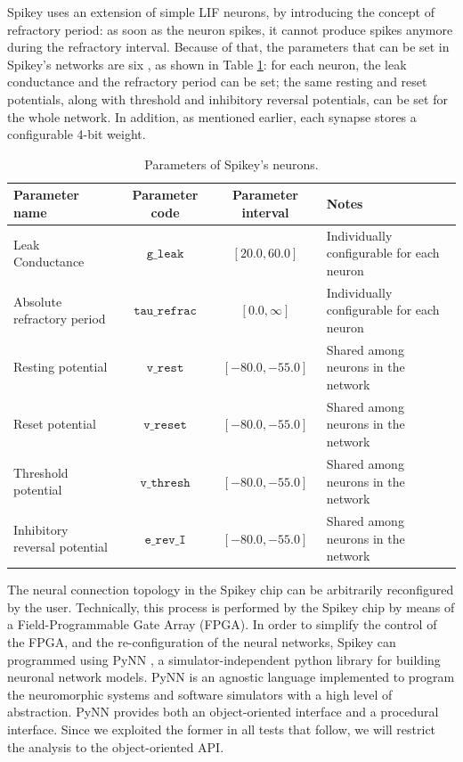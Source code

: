 \documentclass[utf8]{frontiersFPHY} %
\begin{document}
Spikey uses an extension of simple LIF neurons, by introducing the concept  of refractory period: as soon as the neuron spikes, it cannot produce  spikes anymore during the refractory interval. 
Because of that, the parameters that can be set in Spikey's networks are six \cite{Pfeil2013}, as shown in Table \ref{tab:parameters}: for each neuron, the leak conductance and the refractory period can be set; the same resting and reset potentials, along with threshold and inhibitory reversal potentials, can be set for the whole network. In addition, as mentioned earlier, each synapse stores a configurable 4-bit weight.


\begin{table}[tb]
	\caption{Parameters of Spikey's neurons.}

	\label{tab:parameters}

	\centering
	\small
	\begin{tabular}{l|c|c|l}
	\hline
	\textbf{Parameter name}  & \textbf{Parameter code} & \textbf{Parameter interval} & \textbf{Notes} \\
	\hline
	\hline
		Leak Conductance	 & $\texttt{g\_leak}$ &  $[20.0, 60.0]$ & Individually configurable for each neuron \\
	\hline
		Absolute refractory period	 & $\texttt{tau\_refrac}$ &  $[0.0, \infty]$ & Individually configurable for each neuron \\
	\hline
		Resting potential 	&  $\texttt{v\_rest}$ & 	$[-80.0, -55.0]$ &	Shared among neurons in the network\\
	\hline
		Reset potential 	&  $\texttt{v\_reset}$ & 	$[-80.0, -55.0]$ &	Shared among neurons in the network\\
	\hline
		Threshold potential 	&  $\texttt{v\_thresh}$ & 	$[-80.0, -55.0]$ &	Shared among neurons in the network\\
	\hline
		Inhibitory reversal potential 	&  $\texttt{e\_rev\_I}$ & $[-80.0, -55.0]$ &	Shared among neurons in the network\\
	\hline

	\end{tabular}
\end{table}

The neural connection topology in the Spikey chip can be arbitrarily reconfigured by the user.
Technically, this process is performed by the Spikey chip by means of a  Field-Programmable Gate Array (FPGA). 
In order to simplify the control of the FPGA, and the re-configuration of the neural networks, Spikey can programmed using PyNN \cite{Davison2009}, a simulator-independent python library for building neuronal network models. 
PyNN is an agnostic language implemented to program the neuromorphic systems and software simulators with a high level of abstraction. 
PyNN provides both an object-oriented interface and a procedural interface. 
Since we exploited the former in all tests that follow, we will restrict the analysis to the object-oriented API. 
\end{document}
